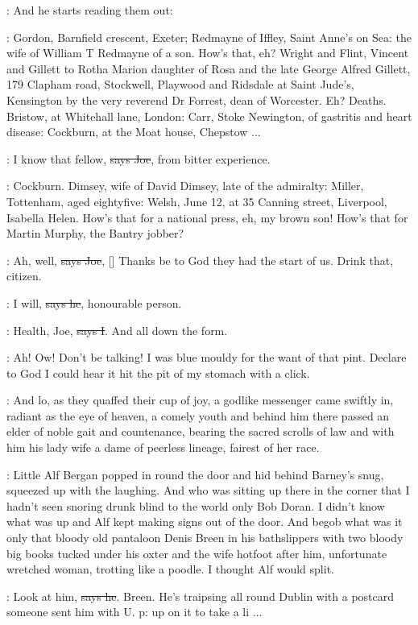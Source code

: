 \Nq:
And he starts reading them out:

\citizen:
Gordon, Barnfield crescent, Exeter;
Redmayne of Iffley, Saint Anne's on
Sea: the wife of William T Redmayne of a son. How's that, eh? Wright and
Flint, Vincent and Gillett to Rotha Marion daughter of Rosa and the late
George Alfred Gillett, 179 Clapham road, Stockwell, Playwood and
Ridsdale at Saint Jude's, Kensington by the very reverend Dr Forrest, dean
of Worcester. Eh? Deaths.
Bristow, at Whitehall lane, London: Carr, Stoke
Newington, of gastritis and heart disease: Cockburn, at the Moat house,
Chepstow ...

\joe:
I know that fellow, \sout{says Joe},
from bitter experience.

\citizen:
Cockburn. Dimsey, wife of David Dimsey,
late of the admiralty: Miller,
Tottenham, aged eightyfive: Welsh, June 12, at 35 Canning street,
Liverpool, Isabella Helen. How's that for a national press, eh, my brown
son! How's that for Martin Murphy, the Bantry jobber?

\joe:
Ah, well, \sout{says Joe},
[]
Thanks be to God they had
the start of us. Drink that, citizen.

\citizen:
I will, \sout{says he}, honourable person.

:
Health, Joe, \sout{says I}.
And all down the form.

\Nq:
Ah! Ow! Don't be talking! I was blue mouldy for the want of that
pint. Declare to God I could hear it hit the pit of my stomach with a
click.

:
And lo, as they quaffed their cup of joy, a godlike messenger came
swiftly in, radiant as the eye of heaven, a comely youth and behind him
there passed an elder of noble gait and countenance, bearing the sacred
scrolls of law and with him his lady wife a dame of peerless lineage,
fairest of her race.

\Nq:
Little Alf Bergan popped in round the door and hid behind Barney's
snug, squeezed up with the laughing.
And who was sitting up there in the
corner that I hadn't seen snoring drunk blind to the world only Bob Doran.
I didn't know what was up and Alf kept making signs out of the door. And
begob what was it only that bloody old pantaloon Denis Breen in his
bathslippers with two bloody big books tucked under his oxter and the wife
hotfoot after him, unfortunate wretched woman, trotting like a poodle. I
thought Alf would split.

\bergan:
Look at him, \sout{says he}. Breen.
He's traipsing all round Dublin with a
postcard someone sent him with U. p: up on it to take a li ...

